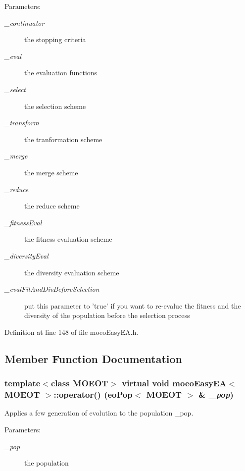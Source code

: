 \begin{Desc}
\item[Parameters:]
\begin{description}
\item[{\em \_\-continuator}]the stopping criteria \item[{\em \_\-eval}]the evaluation functions \item[{\em \_\-select}]the selection scheme \item[{\em \_\-transform}]the tranformation scheme \item[{\em \_\-merge}]the merge scheme \item[{\em \_\-reduce}]the reduce scheme \item[{\em \_\-fitness\-Eval}]the fitness evaluation scheme \item[{\em \_\-diversity\-Eval}]the diversity evaluation scheme \item[{\em \_\-eval\-Fit\-And\-Div\-Before\-Selection}]put this parameter to 'true' if you want to re-evalue the fitness and the diversity of the population before the selection process \end{description}
\end{Desc}


Definition at line 148 of file moeo\-Easy\-EA.h.

\subsection{Member Function Documentation}
\subsubsection{\setlength{\rightskip}{0pt plus 5cm}template$<$class MOEOT$>$ virtual void \bf{moeo\-Easy\-EA}$<$ MOEOT $>$::operator() (\bf{eo\-Pop}$<$ MOEOT $>$ \& {\em \_\-pop})\hspace{0.3cm}{\tt  [inline, virtual]}}\label{classmoeoEasyEA_f18e8fd179fbb2b89f4a59d213317170}


Applies a few generation of evolution to the population \_\-pop. 

\begin{Desc}
\item[Parameters:]
\begin{description}
\item[{\em \_\-pop}]the population \end{description}
\end{Desc}


